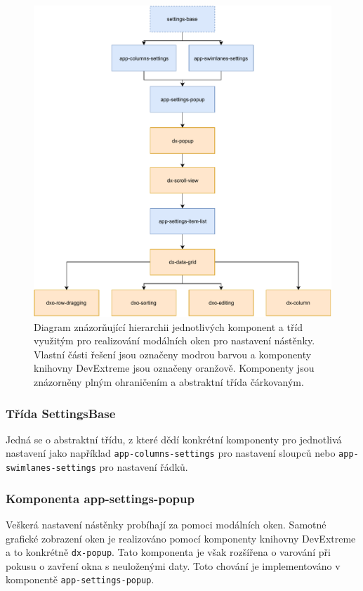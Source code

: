\begin{figure}[H]
	\centering
	\label{img:settings-dia}
	\includegraphics[width=\textwidth]{obrazky-figures/settings-diagram.pdf}
	\caption{Diagram znázorňující hierarchii jednotlivých komponent a tříd využitým pro realizování modálních oken pro nastavení nástěnky. Vlastní části řešení jsou označeny modrou barvou a komponenty knihovny DevExtreme jsou označeny oranžově. Komponenty jsou znázorněny plným ohraničením a abstraktní třída čárkovaným.}
\end{figure}


\subsubsection*{Třída SettingsBase}
Jedná se o abstraktní třídu, z které dědí konkrétní komponenty pro jednotlivá nastavení jako například \texttt{app-columns-settings} pro nastavení sloupců nebo  \texttt{app-swimlanes-settings} pro nastavení řádků.


\subsubsection*{Komponenta app-settings-popup}
Veškerá nastavení nástěnky probíhají za pomoci modálních oken. Samotné grafické zobrazení oken je realizováno pomocí komponenty knihovny DevExtreme a to konkrétně \texttt{dx-popup}. Tato komponenta je však rozšířena o varování při pokusu o zavření okna s neuloženými daty. Toto chování je implementováno v komponentě \texttt{app-settings-popup}.


